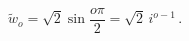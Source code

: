 \begin{equation}
\tilde{w}_{o}=\sqrt{2}\sin {\frac{o\pi }{2}}=\sqrt{2}\,i^{o-1}\,.
\label{eq:tilwinfty}
\end{equation}

